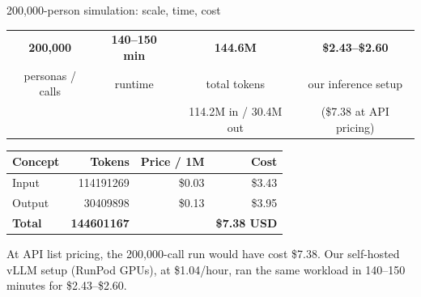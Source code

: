 \documentclass[aspectratio=169,11pt]{beamer}
\newcommand{\mynote}[1]{\vspace{0.4em}\footnotesize\color{gray}#1}
\begin{document}
	\begin{frame}{200{,}000-person simulation: scale, time, cost}
		\begin{center}
			\begin{tabular}{c c c c}
				\textbf{200{,}000} & \textbf{140--150 min} & \textbf{144.6M} & \textbf{\color{accent}\$2.43--\$2.60} \\
				personas / calls & runtime & total tokens & our inference setup \\[0.2em]
				& & 114.2M in / 30.4M out & (\$7.38 at API pricing) \\
			\end{tabular}
		\end{center}
		\vspace{0.6em}
		
		\begin{center}
			{\renewcommand{\arraystretch}{1.25}\setlength{\tabcolsep}{14pt}
				\begin{tabular}{l r r r}
					\toprule
					\textbf{Concept} & \textbf{Tokens} & \textbf{Price / 1M} & \textbf{Cost} \\
					\midrule
					Input  & \num{114191269} & \$0.03 & \$3.43 \\
					Output & \num{30409898}  & \$0.13 & \$3.95 \\
					\midrule
					\textbf{Total} & \textbf{\num{144601167}} & & \textbf{\color{accent}\$7.38 USD} \\
					\bottomrule
			\end{tabular}}
		\end{center}
		\mynote{At API list pricing, the 200{,}000-call run would have cost \$7.38.
			Our self-hosted vLLM setup (RunPod GPUs), at \$1.04/hour, ran the
			same workload in 140--150 minutes for \$2.43--\$2.60.}
	\end{frame}
	
\end{document}
